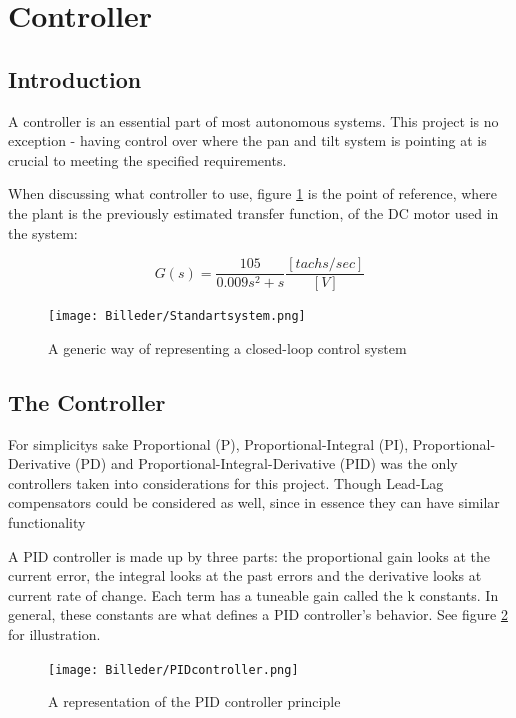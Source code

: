 \newpage

\section{Controller}
\subsection{Introduction}
A controller is an essential part of most autonomous systems. This project is no exception - having control over where the pan and tilt system is pointing at is crucial to meeting the specified requirements.

When discussing what controller to use, figure \ref{fig:Standartsystem} is the point of reference, where the plant is the previously estimated transfer function, of the DC motor used in the system:

\begin{equation}
G(s)=\frac{105}{0.009s^2+s} \frac{[tachs/sec]}{[V]}
\end{equation}

\begin{figure}[h!]
\centering
\texttt{[image: Billeder/Standartsystem.png]}
\caption{ A generic way of representing a closed-loop control system }
\label{fig:Standartsystem}
\end{figure}

\newpage

\subsection{The Controller}
For simplicitys sake Proportional (P), Proportional-Integral (PI), Proportional-Derivative (PD) and Proportional-Integral-Derivative (PID) was the only controllers taken into considerations for this project. Though Lead-Lag compensators could be considered as well, since in essence they can have similar functionality\par

A PID controller is made up by three parts: the proportional gain looks at the current error, the integral looks at the past errors and the derivative looks at current rate of change. Each term has a tuneable gain called the k constants. In general, these constants are what defines a PID controller’s behavior. See figure \ref{fig:PID controller} for illustration. 

\begin{figure}[h!]
\centering
\texttt{[image: Billeder/PIDcontroller.png]}
\caption{ A representation of the PID controller principle }
\label{fig:PID controller}
\end{figure}

